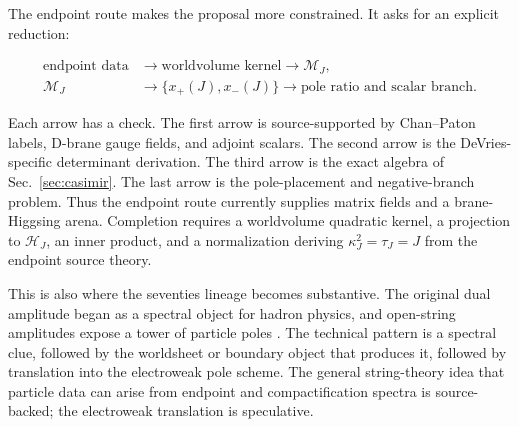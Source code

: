 The endpoint route makes the proposal more constrained.  It asks for an explicit reduction:
\begin{widetext}
\begin{equation}
  \begin{aligned}
  \text{endpoint data}
  &\longrightarrow
  \text{worldvolume kernel}
  \longrightarrow
  \mathcal M_J,\\
  \mathcal M_J
  &\longrightarrow
  \{x_+(J),x_-(J)\}
  \longrightarrow
  \text{pole ratio and scalar branch}.
  \end{aligned}
  \label{eq:endpoint-completion-chain}
\end{equation}
\end{widetext}
Each arrow has a check.  The first arrow is source-supported by Chan--Paton labels, D-brane gauge fields, and adjoint scalars.  The second arrow is the DeVries-specific determinant derivation.  The third arrow is the exact algebra of Sec.~\ref{sec:casimir}.  The last arrow is the pole-placement and negative-branch problem.
Thus the endpoint route currently supplies matrix fields and a brane-Higgsing
arena.  Completion requires a worldvolume quadratic kernel, a projection to
\(\mathcal H_J\), an inner product, and a normalization deriving
\(\kappa_J^2=\tau_J=J\) from the endpoint source theory.

This is also where the seventies lineage becomes substantive.  The original dual amplitude began as a spectral object for hadron physics, and open-string amplitudes expose a tower of particle poles \cite{TongString}.  The technical pattern is a spectral clue, followed by the worldsheet or boundary object that produces it, followed by translation into the electroweak pole scheme.  The general string-theory idea that particle data can arise from endpoint and compactification spectra is source-backed; the electroweak translation is speculative.
